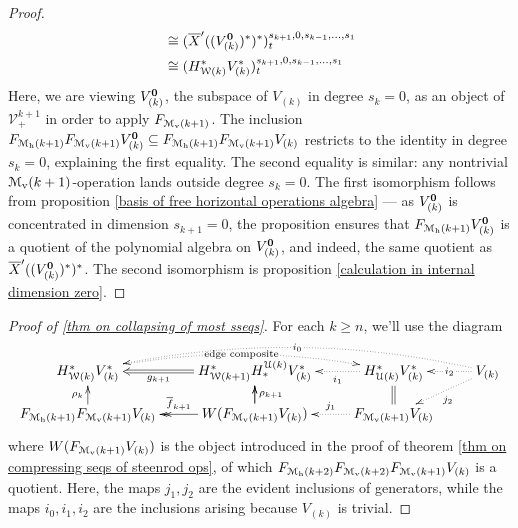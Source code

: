 \documentclass[11pt]{amsart}
\theoremstyle{plain}
\theoremstyle{definition}
\newcommand{\calW}{\mathcal{W}}
\newcommand{\calU}{\mathcal{U}}
\newcommand{\calV}{\mathcal{V}}
\newcommand{\calM}{\mathcal{M}}
\theoremstyle{plain}
\newcommand{\vect}[2]{\calV^{#1}_{#2}}
\newcommand{\UEAX}{\overline{X}'}%
\begin{document}
\begin{Calculations of HWn for n nonzero}
\begin{proof}
\begin{alignat*}{2}
&\cong (\UEAX((V_{(k)}^{\textbf{\textup{0}}})^*)^*)^{s_{k+1},0,s_{k-1},\ldots,s_1}_{t}\\
&\cong (H_{\calW(k)}^{*}V^{*}_{(k)})^{s_{k+1},0,s_{k-1},\ldots,s_1}_{t}
\end{alignat*}
Here, we are viewing $V_{(k)}^{\textbf{\textup{0}}}$, the subspace of $V_{(k)}$ in degree $s_k=0$, as an object of $\vect{k+1}{+}$ in order to apply $F_{\calM_\textup{v}(k+1)}$. The inclusion $F_{\calM_{\textup{h}}(k+1)}F_{\calM_{\textup{v}}(k+1)}V_{(k)}^{\textbf{\textup{0}}}\subseteq F_{\calM_{\textup{h}}(k+1)}F_{\calM_{\textup{v}}(k+1)}V_{(k)}$ restricts to the identity in degree $s_k=0$, explaining the first equality. The second equality is similar: any nontrivial $\calM_\textup{v}(k+1)$-operation lands outside degree $s_k=0$. The first isomorphism follows from proposition \ref{basis of free horizontal operations algebra} --- as $V_{(k)}^{\textbf{\textup{0}}}$ is concentrated in dimension $s_{k+1}=0$, the proposition ensures that $F_{\calM_{\textup{h}}(k+1)}V_{(k)}^{\textbf{\textup{0}}}$ is a quotient of the polynomial algebra on $V_{(k)}^{\textbf{\textup{0}}}$, and indeed, the same quotient as $\UEAX((V_{(k)}^{\textbf{\textup{0}}})^*)^*$. The second isomorphism is proposition \ref{calculation in internal dimension zero}.
\end{proof}
\begin{proof}[Proof of \ref{thm on collapsing of most sseqs}]
For each $k\geq n$, we'll use the diagram
\[\xymatrix@R=4mm{
H_{\calW(k)}^{*}V^{*}_{(k)}\ar@{..>}@/^1.22em/[rr]|-{\textup{\,edge composite\,}}
&H_{\calW(k+1)}^{*}H_*^{\calU(k)}V_{(k)}^*\ar@{=>}[l]^-{g_{k+1}}%
&H^*_{\calU(k)}V^*_{(k)}\ar@{..>}[l]^-{i_1}
&V_{(k)}\ar@{..>}[l]|-{\,i_2\,}\ar@{..>}[ld]^-{j_2}\ar@{..>}@/_1.72em/[lll]|-{\,i_0\,}
\\
F_{\calM_{\textup{h}}(k+1)}F_{\calM_{\textup{v}}(k+1)}V_{(k)}\ar[u]^-{\rho_k}
&W(F_{\calM_\textup{v}(k+1)}V_{(k)})\ar[u]\ar@{->>}[l]_-{\overline{f}_{k+1}}\ar[u]_-{\rho_{k+1}}
&F_{\calM_\textup{v}(k+1)}V_{(k)}\ar@{..>}[l]_-{j_1}\ar@{=}[u]%
}\]
where $W(F_{\calM_\textup{v}(k+1)}V_{(k)})$ is the object introduced in the proof of theorem \ref{thm on compressing seqs of steenrod ops}, of which $F_{\calM_{\textup{h}}(k+2)}F_{\calM_{\textup{v}}(k+2)}F_{\calM_\textup{v}(k+1)}V_{(k)}$ is a quotient. Here, the maps $j_1,j_2$ are the evident inclusions of generators, while the maps $i_0,i_1,i_2$ are the inclusions arising because $V_{(k)}$ is trivial.


\end{proof}
\end{Calculations of HWn for n nonzero}
\end{document}
